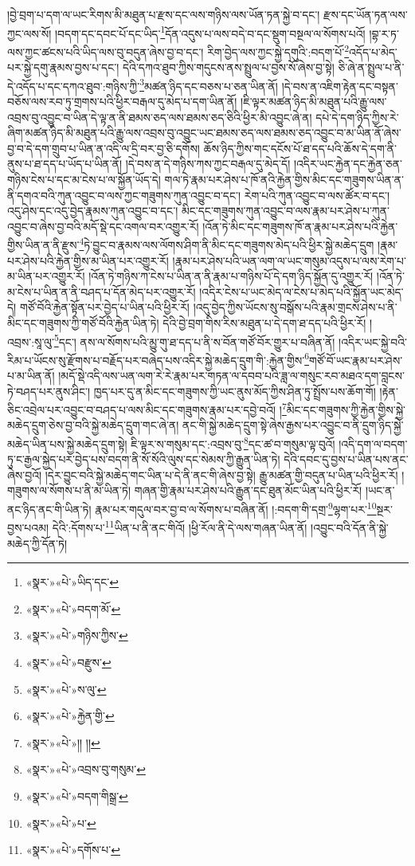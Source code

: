 །བྱེ་བྲག་པ་དག་ལ་ཡང་རིགས་མི་མཐུན་པ་རྫས་དང་ལས་གཉིས་ལས་ཡོན་ཏན་སྐྱེ་བ་དང་། རྫས་དང་ཡོན་ཏན་ལས་ཀྱང་ལས་སོ། །བདག་དང་དབང་པོ་དང་ཡིད་\footnote{«སྣར་»«པེ་»ཡིད་དང་}དོན་འདུས་པ་ལས་བདེ་བ་དང་སྡུག་བསྔལ་ལ་སོགས་པའོ། །བྷ་ར་ཏ་ལས་ཀྱང་ཚངས་པའི་ཡིད་ལས་བུ་བདུན་ཞེས་བྱ་བ་དང་། རིག་བྱེད་ལས་ཀྱང་སྐྱེ་དགུའི་:བདག་པོ་\footnote{«སྣར་»«པེ་»བདག་མོ་}འདོད་པ་མེད་པར་སྐྱེ་དགུ་རྣམས་བྱས་པ་དང་། དེའི་དཀའ་ཐུབ་ཀྱིས་གདུངས་ནས་སྤྲུལ་པ་བྱས་སོ་ཞེས་བྱ་སྟེ། ཅི་ཞེ་ན་སྤྲུལ་པ་ནི་དེ་འདོད་པ་དང་དཀའ་ཐུབ་:གཉིས་ཀྱི་\footnote{«སྣར་»«པེ་»གཉིས་ཀྱིས་}མཚན་ཉིད་དང་བཅས་པ་ཅན་ཡིན་ནོ། །དེ་བས་ན་འཇིག་རྟེན་དང་བསྟན་བཅོས་ལས་རབ་ཏུ་གྲགས་པའི་ཕྱིར་བརྒལ་དུ་མེད་པ་དག་ཡིན་ནོ། །ཇི་ལྟར་མཚན་ཉིད་མི་མཐུན་པའི་རྒྱུ་ལས་འབྲས་བུ་འབྱུང་བ་ཡིན་དེ་ལྟ་ན་ནི་ཐམས་ཅད་ལས་ཐམས་ཅད་ཅིའི་ཕྱིར་མི་འབྱུང་ཞེ་ན། དཔེ་དེ་དག་ཉིད་ཀྱིས་རེ་ཞིག་མཚན་ཉིད་མི་མཐུན་པའི་རྒྱུ་ལས་འབྲས་བུ་འབྱུང་ཡང་ཐམས་ཅད་ལས་ཐམས་ཅད་འབྱུང་བ་མ་ཡིན་ནོ་ཞེས་བྱ་བ་དེ་དག་གྲུབ་པ་ཡིན་ན་འདི་ལ་དྲི་བར་བྱ་ཅི་དགོས། ཆོས་ཉིད་ཀྱིས་གང་དངོས་པོ་ཐ་དད་པའི་ཆོས་དེ་དག་ནི་ནུས་པ་ཐ་དད་པ་ཡོད་པ་ཡིན་ནོ། །དེ་བས་ན་དེ་གཉིས་ཀས་ཀྱང་བརྒལ་དུ་མེད་དོ། །འདིར་ཡང་རྐྱེན་དང་རྐྱེན་ཅན་གཉིས་ངེས་པ་དང་མ་ངེས་པ་ལ་སྐྱོན་ཡོད་དེ། གལ་ཏེ་རྣམ་པར་ཤེས་པ་ཁོ་ནའི་རྐྱེན་གྱིས་མིང་དང་གཟུགས་ཡིན་ན་ནི་དགའ་བའི་ཀུན་འབྱུང་བ་ལས་ཀྱང་གཟུགས་ཀུན་འབྱུང་བ་དང་། རེག་པའི་ཀུན་འབྱུང་བ་ལས་ཚོར་བ་དང་། འདུ་ཤེས་དང་འདུ་བྱེད་རྣམས་ཀུན་འབྱུང་བ་དང་། མིང་དང་གཟུགས་ཀུན་འབྱུང་བ་ལས་རྣམ་པར་ཤེས་པ་ཀུན་འབྱུང་བ་ཞེས་བྱ་བའི་མདོ་སྡེ་དང་འགལ་བར་འགྱུར་རོ། །འོན་ཏེ་མིང་དང་གཟུགས་ཁོ་ན་རྣམ་པར་ཤེས་པའི་རྐྱེན་གྱིས་ཡིན་ན་ནི་རྫུས་\footnote{«སྣར་»«པེ་»བརྫུས་}ཏེ་བྱུང་བ་རྣམས་ལས་ལོགས་ཤིག་ནི་མིང་དང་གཟུགས་མེད་པའི་ཕྱིར་སྐྱེ་མཆེད་དྲུག །རྣམ་པར་ཤེས་པའི་རྐྱེན་གྱིས་མ་ཡིན་པར་འགྱུར་རོ། །རྣམ་པར་ཤེས་པའི་ཡན་ལག་ལ་ཡང་གསུམ་འདུས་པ་ལས་རེག་པ་མ་ཡིན་པར་འགྱུར་རོ། །འོན་ཏེ་གཉིས་ཀ་ངེས་པ་ཡིན་ན་ནི་རྣམ་པ་གཉིས་པོ་དེ་དག་ཉིད་སྐྱོན་དུ་འགྱུར་རོ། །འོན་ཏེ་མ་ངེས་པ་ཡིན་ན་ནི་བཤད་པ་དོན་མེད་པར་འགྱུར་རོ། །འདིར་ངེས་པ་ཡང་མེད་ལ་ངེས་པ་མེད་པའི་སྐྱོན་ཡང་མེད་དེ། གཙོ་བོའི་རྐྱེན་སྟོན་པར་བྱེད་པ་ཡིན་པའི་ཕྱིར་རོ། །འདུ་བྱེད་ཀྱིས་ཡོངས་སུ་བསྒོས་པའི་རྣམ་གྲངས་ཤེས་པ་ནི་མིང་དང་གཟུགས་ཀྱི་གཙོ་བོའི་རྐྱེན་ཡིན་ཏེ། དེའི་བྱེ་བྲག་གིས་རིས་མཐུན་པ་དེ་དག་ཐ་དད་པའི་ཕྱིར་རོ། །འབྲས་:སཱ་ལུ་\footnote{«སྣར་»«པེ་»ས་ལུ་}དང་། ནས་ལ་སོགས་པའི་མྱུ་གུ་ཐ་དད་པ་ནི་ས་བོན་གཙོ་བོར་གྱུར་པ་བཞིན་ནོ། །འདིར་ཡང་སྐྱེ་བའི་རིམ་པ་ཡོངས་སུ་རྫོགས་པ་བརྗོད་པར་བཞེད་པས་འདིར་སྐྱེ་མཆེད་དྲུག་གི་:རྐྱེན་གྱིས་\footnote{«སྣར་»«པེ་»རྐྱེན་གྱི་}གཙོ་བོ་ཡང་རྣམ་པར་ཤེས་པ་མ་ཡིན་ནོ། །མདོ་སྡེ་འདི་ལས་ཡན་ལག་རེ་རེ་རྣམ་པར་གཏན་ལ་དབབ་པའི་ཟླ་ལ་གསུང་རབ་མཐའ་དག་བླངས་ཏེ་བཤད་པར་ནུས་ཤིང་། ཁྱད་པར་དུ་ན་མིང་དང་གཟུགས་ཀྱི་ཡང་ནུས་མོད་ཀྱིས་ཤིན་ཏུ་སྤྲོས་པས་ཆོག་གོ། །རྟེན་ཅིང་འབྲེལ་པར་འབྱུང་བ་བཤད་པ་ལས་མིང་དང་གཟུགས་རྣམ་པར་དབྱེ་བའོ། །\footnote{«སྣར་»«པེ་»།། །།}མིང་དང་གཟུགས་ཀྱི་རྐྱེན་གྱིས་སྐྱེ་མཆེད་དྲུག་ཅེས་བྱ་བའི་སྐྱེ་མཆེད་དྲུག་གང་ཞེ་ན། ནང་གི་སྐྱེ་མཆེད་དྲུག་སྟེ་ཞེས་རྒྱས་པར་འབྱུང་བ་ནི་དྲུག་ཉིད་སྐྱེ་མཆེད་ཡིན་པས་སྐྱེ་མཆེད་དྲུག་སྟེ། ཇི་ལྟར་ས་གསུམ་དང་:འབྲས་བུ་\footnote{«སྣར་»«པེ་»འབྲས་བུ་གསུམ་}དང་ཚ་བ་གསུམ་ལྟ་བུའོ། །འདི་དག་ལ་བདག་ཏུ་ང་རྒྱལ་སྐྱེད་པར་བྱེད་པས་བདག་ནི་སོ་སོའི་ལུས་དང་སེམས་ཀྱི་རྒྱུན་ཡིན་ཏེ། དེའི་དབང་དུ་བྱས་པ་ཡིན་པས་ནང་ཞེས་བྱའོ། །དེར་བྱུང་བའི་སྐྱེ་མཆེད་གང་ཡིན་པ་དེ་ནི་ནང་གི་ཞེས་བྱ་སྟེ། རྒྱུ་མཚན་གྱི་བདུན་པ་ཡིན་པའི་ཕྱིར་རོ། །གཟུགས་ལ་སོགས་པ་ནི་མ་ཡིན་ཏེ། གཞན་གྱི་རྣམ་པར་ཤེས་པའི་རྒྱུན་དང་ཐུན་མོང་ཡིན་པའི་ཕྱིར་རོ། །ཡང་ན་ནང་ཉིད་ནང་གི་ཡིན་ཏེ། རྣམ་པར་གདུལ་བར་བྱ་བ་ལ་སོགས་པ་བཞིན་ནོ། །:བདག་གི་དགྲ་\footnote{«སྣར་»«པེ་»བདག་གིསྒྲ་}ལྷག་པར་\footnote{«སྣར་»«པེ་»པ་}སྔར་བྱས་པའམ། དེའི་:དོགས་པ་\footnote{«སྣར་»«པེ་»དགོས་པ་}ཡིན་པ་ནི་ནང་གིའོ། །ཕྱི་རོལ་ནི་དེ་ལས་གཞན་ཡིན་ནོ། །འབྱུང་བའི་དོན་ནི་སྐྱེ་མཆེད་ཀྱི་དོན་ཏེ། 
